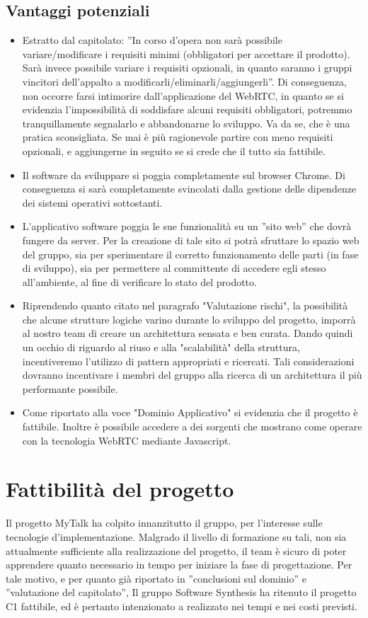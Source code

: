 \subsection{Vantaggi potenziali}
\begin{itemize}
	\item Estratto dal capitolato: ''In corso d'opera non sarà possibile variare/modificare i requisiti minimi (obbligatori per accettare il prodotto). Sarà invece possibile variare i requisiti opzionali, in quanto saranno i gruppi vincitori dell'appalto a modificarli/eliminarli/aggiungerli''. Di conseguenza, non occorre farsi intimorire dall'applicazione del WebRTC, in quanto se si evidenzia l'impossibilità di soddisfare alcuni requisiti obbligatori, potremmo tranquillamente segnalarlo e abbandonarne lo sviluppo. Va da se, che è una pratica sconsigliata. Se mai è più ragionevole partire con meno requisiti opzionali, e aggiungerne in seguito se si crede che il tutto sia fattibile.
	\item Il software da sviluppare si poggia completamente sul browser Chrome. Di conseguenza si sarà completamente svincolati dalla gestione delle dipendenze dei sistemi operativi sottostanti.
	\item L'applicativo software poggia le sue funzionalità su un ''sito web'' che dovrà fungere da server. Per la creazione di tale sito si potrà sfruttare lo spazio web del gruppo, sia per sperimentare il corretto funzionamento delle parti (in fase di sviluppo), sia per permettere al committente di accedere egli stesso all'ambiente, al fine di verificare lo stato del prodotto.
	\item Riprendendo quanto citato nel paragrafo  "Valutazione rischi", la possibilità che alcune strutture logiche varino durante lo sviluppo del progetto, imporrà al nostro team di creare un architettura sensata e ben curata. Dando quindi un occhio di riguardo al riuso e alla "scalabilità" della struttura, incentiveremo l'utilizzo di pattern appropriati e ricercati. Tali considerazioni dovranno incentivare i membri del gruppo alla ricerca di un architettura il più performante possibile.
	\item Come riportato alla voce "Dominio Applicativo" si evidenzia che il progetto è fattibile. Inoltre è possibile accedere a dei sorgenti che mostrano come operare con la tecnologia WebRTC mediante Javascript.
\end{itemize}

\section{Fattibilità del progetto}
Il progetto MyTalk ha colpito innanzitutto il gruppo, per l'interesse sulle tecnologie d'implementazione. Malgrado il livello di formazione su tali, non sia attualmente sufficiente alla realizzazione del progetto, il team è sicuro di poter apprendere quanto necessario in tempo per iniziare la fase di progettazione. Per tale motivo, e per quanto già riportato in ''conclusioni sul dominio'' e ''valutazione del capitolato'', Il gruppo Software Synthesis ha ritenuto il progetto C1 fattibile, ed è pertanto intenzionato a realizzato nei tempi e nei costi previsti.

